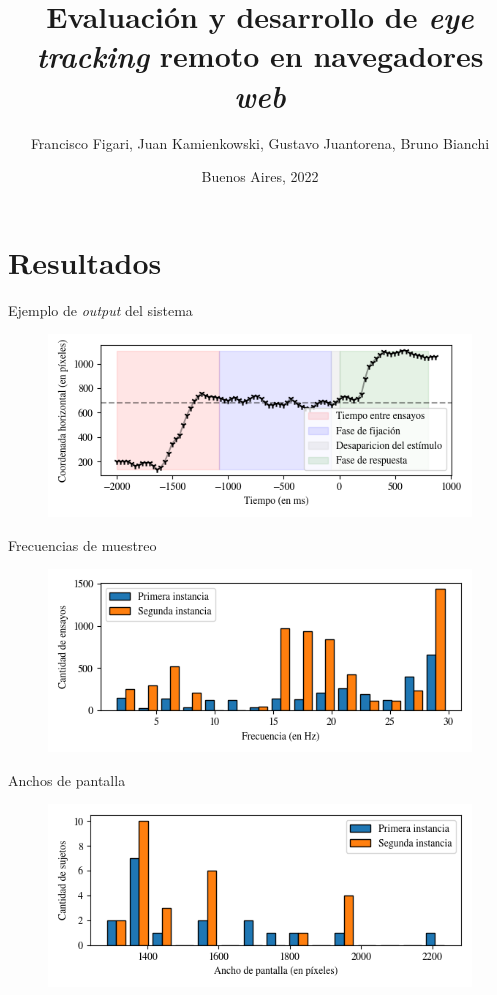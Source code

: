 \documentclass[aspectratio=169]{beamer}
\title{Evaluación y desarrollo de \textit{eye tracking} remoto en navegadores
\textit{web}}
\author{Francisco Figari, Juan Kamienkowski, Gustavo Juantorena, Bruno Bianchi}
\date{Buenos Aires, 2022}
\begin{document}
\frame{\titlepage}

\section{Resultados}

\begin{frame}{Ejemplo de \textit{output} del sistema}
  \begin{figure}
    \centering
    \includegraphics[width=\linewidth]{plots/output-example.png}
  \end{figure}
\end{frame}

\begin{frame}{Frecuencias de muestreo}
  \begin{figure}
    \centering
    \includegraphics[width=\linewidth]{plots/sampling-frequencies-distribution.png}
  \end{figure}
\end{frame}

\begin{frame}{Anchos de pantalla}
  \begin{figure}
    \centering
    \includegraphics[width=\linewidth]{plots/screens-widths-distribution.png}
  \end{figure}
\end{frame}
\end{document}
